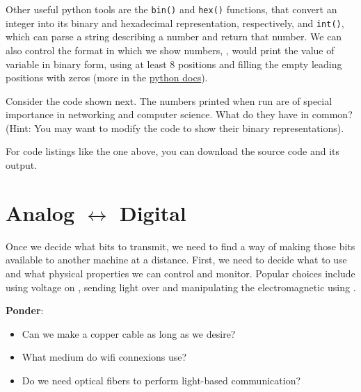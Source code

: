 Other useful python tools are the \texttt{bin()} and \texttt{hex()} functions, that convert an integer 
into its binary and hexadecimal representation, respectively, and \texttt{int()}, which can parse
a string describing a number and return that number. We can also control the format in which we show numbers,
\eg,  would print the value of variable  in binary form, 
using at least 8 positions and filling the empty leading positions with zeros
(more in the \href{https://docs.python.org/3/reference/lexical_analysis.html#f-strings}{python docs}).

\begin{exercise}
Consider the code shown next. The numbers printed when run are of special importance in networking and computer science.
What do they have in common? (Hint: You may want to modify the code to show their binary representations).

\begin{center}
\end{center}
\label{ex:bitwisemanipulation}
\end{exercise}
\begin{remark}
For code listings like the one above, you can download the source code and its output.
\end{remark}


\section{Analog $\leftrightarrow$ Digital}\label{sec:piercing:analog_digital}

Once we decide what bits to transmit, we need to find a way of making those bits available to another machine at a distance.
First, we need to decide what  to use and what physical properties we can control and monitor.
Popular choices include using voltage on , sending light over  and manipulating the 
electromagnetic  using .

\begin{exercise} \textbf{Ponder}:\\[-0.5cm]
\begin{itemize}
\item Can we make a copper cable as long as we desire?
\item What medium do wifi connexions use? 
\item Do we need optical fibers to perform light-based communication?
\end{itemize}
\end{exercise}


